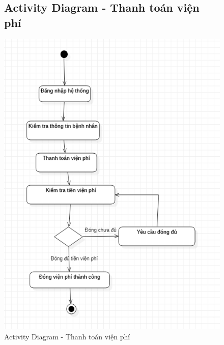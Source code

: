 \documentclass{report}
\begin{document}
\begin{center}
	\begin{figure}[!htp]
		\subsection{Activity Diagram - Thanh toán viện phí}
		\begin{center}
			\includegraphics[scale=1]{Hinh/Activity diagram Thanh toán viện phí.png}
		\end{center}
		\caption{Activity Diagram - Thanh toán viện phí}
	\end{figure}
\end{center}
\end{document}
